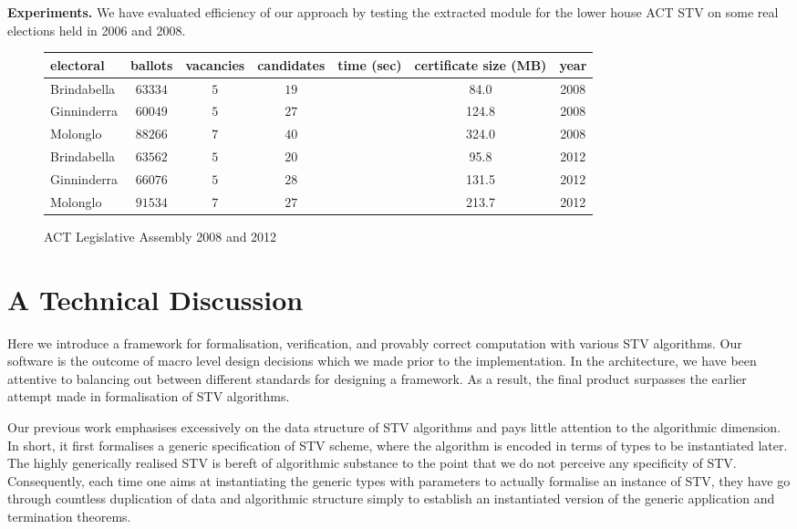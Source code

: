 \documentclass{llncs}
\begin{document}
 \noindent\textbf{Experiments.} We have evaluated efficiency of our approach by testing the extracted module for the lower house ACT STV on some real elections held in 2006 and 2008. \cite{DBLP:journals/jar/AlkassarBMR14}
 \begin{small}
\begin{figure}[b]
\centering
\begin{tabular}{|l |c |c |c |c |c|c|}
\hline
electoral & ballots& vacancies& candidates& time (sec)& certificate size (MB)&year\\
\hline
Brindabella &$63334$&$5$&$19$&&84.0&2008\\
Ginninderra &$60049$&$5$&$27$&&124.8&2008\\
Molonglo &$88266$&$7$&$40$&&324.0&2008\\
Brindabella&$63562$&$5$&$20$&&95.8&2012\\
Ginninderra&$66076$&$5$&$28$&&131.5&2012\\
Molonglo&$91534$&$7$&$27$&&213.7&2012\\
\hline
\end{tabular}
\caption{ACT Legislative Assembly 2008 and 2012}
\label{ref;figure6}
\end{figure}
\end{small}  
\section{A Technical Discussion}
Here we introduce a framework for formalisation, verification, and provably correct computation with various STV algorithms. Our software is the outcome of macro level design decisions which we made prior to the implementation. In the architecture, we have been attentive to  balancing out between different standards for designing a framework. As a result, the final product surpasses the earlier attempt  made in formalisation of STV algorithms\cite{}.

Our previous work emphasises excessively on the data structure of STV algorithms and pays little attention to the algorithmic dimension. In short, it first formalises a  generic  specification of STV scheme, where the algorithm is encoded in terms of types to be instantiated later. The highly generically realised STV is bereft of algorithmic substance to the point that we do not perceive any specificity of STV. Consequently, each time one aims at instantiating the generic types with parameters to actually formalise an instance of STV, they have go through countless  duplication of data and algorithmic structure simply to  establish an instantiated version of the generic application and termination theorems. 
\end{document}
